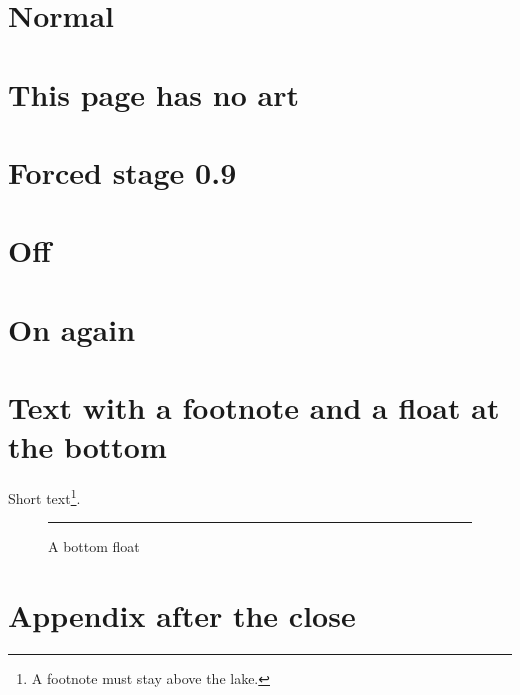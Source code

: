 \documentclass[10pt,a4paper]{article}
\begin{document}
\section{Normal}\lipsum[1-6]
\clearpage
\limenpause
\section{This page has no art}\lipsum[7-9]
\clearpage
{}
\section{Forced stage 0.9}\lipsum[10-12]
\clearpage
\limenlevel{}
\limenoff
\section{Off}\lipsum[13-14]
\clearpage
\limenon
\section{On again}\lipsum[15-17]
\clearpage
\section{Text with a footnote and a float at the bottom}
Short text\footnote{A footnote must stay above the lake.}.
\begin{figure}[b]\centering\rule{6cm}{2cm}\caption{A bottom float}\end{figure}
\limenend
\clearpage
\section{Appendix after the close}\lipsum[18-20]
\end{document}
